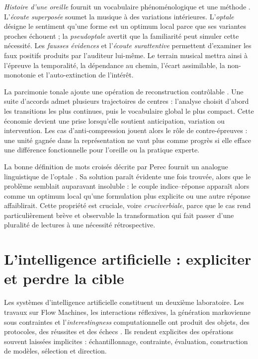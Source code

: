 \documentclass[11pt,a4paper]{article}
\begin{document}
\emph{Histoire d'une oreille} fournit un vocabulaire phénoménologique et une
méthode \parencite{pachet2018oreille}. L'\emph{écoute superposée} soumet la
musique à des variations intérieures. L'\emph{optale} désigne le sentiment
qu'une forme est un optimum local parce que ses variantes proches échouent ; la
\emph{pseudoptale} avertit que la familiarité peut simuler cette nécessité. Les
\emph{fausses évidences} et l'\emph{écoute surattentive} permettent d'examiner
les faux positifs produits par l'auditeur lui-même. Le terrain musical mettra
ainsi à l'épreuve la temporalité, la dépendance au chemin, l'écart assimilable,
la non-monotonie et l'auto-extinction de l'intérêt.

La parcimonie tonale ajoute une opération de reconstruction contrôlable
\parencite{pachet2026tonalparsimony}. Une suite d'accords admet plusieurs
trajectoires de centres : l'analyse choisit d'abord les transitions les plus
continues, puis le vocabulaire global le plus compact. Cette économie devient
une prise lorsqu'elle soutient anticipation, variation ou intervention. Les cas
d'anti-compression jouent alors le rôle de contre-épreuves : une unité gagnée
dans la représentation ne vaut plus comme progrès si elle efface une différence
fonctionnelle pour l'oreille ou la pratique experte.

La bonne définition de mots croisés décrite par Perec fournit un analogue
linguistique de l'optale \parencite{perec1999motscroises}. Sa solution paraît
évidente une fois trouvée, alors que le problème semblait auparavant insoluble : le
couple indice--réponse apparaît alors comme un optimum local qu'une formulation
plus explicite ou une autre réponse affaiblirait. Cette propriété est cruciale,
voire \emph{cruciverbiale}, parce que le cas rend particulièrement brève et
observable la transformation qui fait passer d'une pluralité de lectures à une
nécessité rétrospective.

\section{L'intelligence artificielle : expliciter et perdre la cible}

Les systèmes d'intelligence artificielle constituent un deuxième laboratoire.
Les travaux sur Flow Machines, les interactions réflexives, la génération
markovienne sous contraintes et l'\emph{interestingness} computationnelle ont
produit des objets, des protocoles, des réussites et des échecs
\parencite{pachet1999surprising,pachet1999active,pachet1999programs,pachet2000melodie,
pachet2002continuatorinteraction,pachet2004flowmachines,pachet2004reification,
pachet2004cybernetic,pachet2004childrenreflect,addessi2005experiments,
pachet2006clefs,pachet2006creativity,pachet2006reflective,pachet2008machines,
jones2009stimulating,pachet2006interactionsreflexives,addessi2006flowmachine,
aucouturier2002similarity,pachetroy2008hitsong,pachet2011hitsong,
lerch2011closedloop,
milipachet1995regularity,pachet2012virtuosity,martin2016creativeprocess,
pachet2021assisted,pachet2026markov}.
Ils rendent explicites des opérations souvent laissées implicites :
échantillonnage, contrainte, évaluation, construction de modèles, sélection et
direction.
\end{document}
